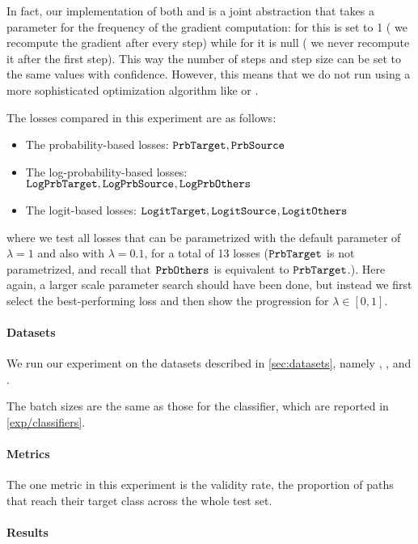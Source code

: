 \documentclass[../main.tex]{subfiles}
\begin{document}
In fact, our implementation of both \ls{} and \revise{} is a joint abstraction that takes a parameter for the frequency of the gradient computation: for \revise{} this is set to 1 (\ie{} we recompute the gradient after every step) while for \ls{} it is null (\ie{} we never recompute it after the first step).
This way the number of steps and step size can be set to the same values with confidence.
However, this means that we do not run \revise{} using a more sophisticated optimization algorithm like  or .

The losses compared in this experiment are as follows:
\begin{itemize}
    \item The probability-based losses: $\mathtt{PrbTarget}, \mathtt{PrbSource}_{}$
    \item The log-probability-based losses: $\mathtt{LogPrbTarget}, \mathtt{LogPrbSource}_{}, \mathtt{LogPrbOthers}_{}$
    \item The logit-based losses: $\mathtt{LogitTarget}, \mathtt{LogitSource}_{}, \mathtt{LogitOthers}_{}$
\end{itemize}
where we test all losses that can be parametrized with the default parameter of $\lambda = 1$ and also with $\lambda = 0.1$, for a total of 13 losses ($\mathtt{PrbTarget}$ is not parametrized, and recall that $\mathtt{PrbOthers}_{}$ is equivalent to $\mathtt{PrbTarget}$.).
Here again, a larger scale parameter search should have been done, but instead we first select the best-performing loss and then show the progression for $\lambda \in [0, 1]$.

\paragraph{Datasets}

We run our experiment on the datasets described in \autoref{sec:datasets}, namely \CakeOnSea, \ForestCover, \WineQuality{} and \OnlineNewsPopularity.

The batch sizes are the same as those for the classifier, which are reported in \autoref{exp/classifiers}.

\paragraph{Metrics}

The one metric in this experiment is the validity rate, \ie{} the proportion of paths that reach their target class across the whole test set.

\paragraph{Results}
\end{document}
